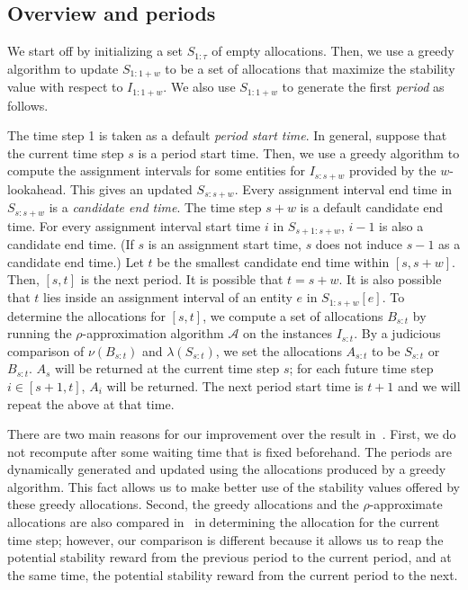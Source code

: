 \documentclass[11pt,a4paper]{article}
\begin{document}
\subsection{Overview and periods}

We start off by initializing a set $S_{1:\tau}$ of empty allocations.  Then, we use a greedy algorithm to update $S_{1:1+w}$ to be a set of allocations that maximize the stability value with respect to $I_{1:1+w}$.  We also use $S_{1:1+w}$ to generate the first \emph{period} as follows. 

The time step 1 is taken as a default \emph{period start time}.  In general, suppose that the current time step $s$ is a period start time.  Then, we use a greedy algorithm to compute the assignment intervals for some entities for $I_{s:s+w}$ provided by the $w$-lookahead.  This gives an updated $S_{s:s+w}$.  Every assignment interval end time in $S_{s:s+w}$ is a \emph{candidate end time}.  The time step $s+w$ is a default candidate end time.  For every assignment interval start time $i$ in $S_{s+1:s+w}$, $i-1$ is also a candidate end time.    (If $s$ is an assignment start time, $s$ does not induce $s-1$ as a candidate end time.)  Let $t$ be the smallest candidate end time within $[s,s+w]$.  Then, $[s,t]$ is the next period.  It is possible that $t = s+w$.  It is also possible that $t$ lies inside an assignment interval of an entity $e$ in $S_{1:s+w}[e]$.  To determine the allocations for $[s,t]$, we compute a set of allocations $B_{s:t}$ by running the $\rho$-approximation algorithm $\mathcal{A}$ on the instances $I_{s:t}$.    By a judicious comparison of $\nu(B_{s:t})$ and $\lambda(S_{s:t})$, we set the allocations $A_{s:t}$ to be $S_{s:t}$ or $B_{s:t}$.  $A_s$ will be returned at the current time step $s$; for each future time step $i \in [s+1,t]$,  $A_i$ will be returned.  The next period start time is $t+1$ and we will repeat the above at that time.

There are two main reasons for our improvement over the result in~\cite{BEM18}.   First, we do not recompute after some waiting time that is fixed beforehand.  The periods are dynamically generated and updated using the allocations produced by a greedy algorithm.  This fact allows us to make better use of the stability values offered by these greedy allocations.  Second, the greedy allocations and the $\rho$-approximate allocations are also compared in~\cite{BEM18} in determining the allocation for the current time step; however, our comparison is different because it allows us to reap the potential stability reward from the previous period to the current period, and at the same time, the potential stability reward from the current period to the next.
\end{document}
